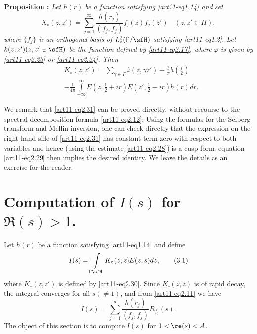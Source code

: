 \medskip
\noindent
{\bfseries Proposition :\label{art11-prop3}}
\textit{Let $h(r)$ be a function satisfying \eqref{art11-eq1.14} and set}
\begin{equation*}
K_\circ (z, z') = \sum\limits^\infty_{j=1} \frac{h(r_j)}{(f_j, f_j)} f_j (z) \overline{f_j (z')} \quad (z, z' \in H), 
\tag{2.30}\label{art11-eq2.30}
\end{equation*}
\textit{where $\{f_j\}$ is an orthogonal basis of $L^2_\circ (\Gamma / \sfH)$ satisfying \eqref{art11-eq1.2}. Let $k(z,z') (z, z' \in \sfH)$ be the function defined by \eqref{art11-eq2.17}, where $\varphi$ is given by \eqref{art11-eq2.23} or \eqref{art11-eq2.24}. Then}  
\begin{align*}
& K_\circ (z,z') =\sum\limits_{\gamma \in \Gamma} k (z, \gamma z') - \frac{3}{\pi} h (\frac{i}{2}) \tag{2.31} \label{art11-eq2.31}\\
& -\frac{1}{4\pi} \int\limits^\infty_{-\infty} E (z, \frac{1}{2} + ir) E (z', \frac{1}{2} - ir) h (r) dr. 
\end{align*}

We remark that \eqref{art11-eq2.31} can be proved directly, without recourse to the spectral decomposition formula \eqref{art11-eq2.12}: Using the formulas for the Selberg transform and Mellin inversion, one can check directly that the expression on the right-hand side of \eqref{art11-eq2.31} has constant term zero with respect to both variables and hence (using the estimate \eqref{art11-eq2.28}) is a cusp form; equation \eqref{art11-eq2.29} then implies the desired identity. We leave the details as an exercise for the reader. 

\section{Computation of $I(s)$ for $\Re (s) >1$.}\label{art11-sec3}
Let $h(r)$ be a function satisfying \eqref{art11-eq1.14} and define 
\begin{equation*}
I(s) = \int\limits_{\Gamma \sfH} K_\circ (z, z) E (z, s) dz,  \tag{3.1}\label{art11-eq3.1}
\end{equation*}
where $K_\circ (z,z')$ is defined by \eqref{art11-eq2.30}. Since $K_\circ (z,z)$ is of rapid decay, the integral converges for all $s(\neq 1)$, and from \eqref{art11-eq2.11} we have 
\begin{equation*}
I(s) = \sum\limits^\infty_{j=1}  \frac{h(r_j)}{(f_j , f_j)} R_{f_j} (s) . \tag{3.2}\label{art11-eq3.2}
\end{equation*}
The object of this section is to compute $I(s)$ for $1 < \re (s) < A$. 

